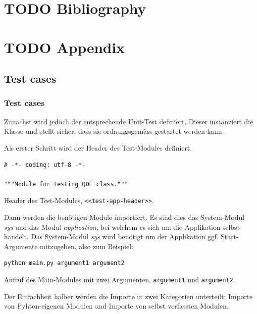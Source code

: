\documentclass[10pt, openright, notitlepage]{scrreprt}
\begin{document}
\chapter{{\bfseries\sffamily TODO} Bibliography}
\label{sec:orga9443b8}
\printbibliography{}
\chapter{{\bfseries\sffamily TODO} Appendix}
\label{sec:org2892e9e}
\section{Test cases}
\label{sec:org3e32dc3}
\subsection{Test cases}
\label{sec:org78b7941}

Zunächst wird jedoch der entsprechende Unit-Test definiert. Dieser instanziert
die Klasse und stellt sicher, dass sie ordnungsgemäss gestartet werden kann.

Als erster Schritt wird der Header des Test-Modules definiert.

\begin{listing}[H]
\begin{verbatim}
# -*- coding: utf-8 -*-

"""Module for testing QDE class."""
\end{verbatim}
\caption{\label{test-app-header}
Header des Test-Modules, \texttt{<<test-app-header>>}.}
\end{listing}

Dann werden die benötigen Module importiert. Es sind dies das System-Modul
\emph{sys} und das Modul \emph{application}, bei welchem es sich um die Applikation
selbst handelt. Das System-Modul \emph{sys} wird benötigt um der Applikation ggf.
Start-Argumente mitzugeben, also zum Beispiel:

\begin{listing}[H]
\begin{verbatim}
python main.py argument1 argument2
\end{verbatim}
\caption{\label{fig:impl-python-call-arguments}
Aufruf des Main-Modules mit zwei Argumenten, \texttt{argument1} und \texttt{argument2}.}
\end{listing}

Der Einfachheit halber werden die Importe in zwei Kategorien unterteilt: Importe
von Pyhton-eigenen Modulen und Importe von selbst verfassten Modulen.
\end{document}

